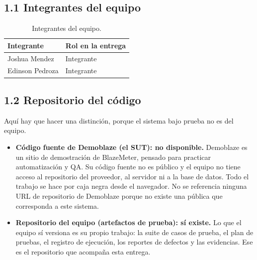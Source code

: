 \subsection*{1.1 Integrantes del equipo}

\begingroup
\small
\renewcommand{\arraystretch}{1.25}
\begin{table}[htb]\centering\small
\caption{Integrantes del equipo.}\label{tab:integrantes}
\begin{tabularx}{\textwidth}{@{}L{6cm} Y@{}}
\toprule
\textbf{Integrante} & \textbf{Rol en la entrega} \\
\midrule
Joshua Mendez & Integrante \\
Edinson Pedroza & Integrante \\
\bottomrule
\end{tabularx}
\end{table}
\endgroup

\subsection*{1.2 Repositorio del código}

Aquí hay que hacer una distinción, porque el sistema bajo prueba no es del equipo.

\begin{itemize}
  \item \textbf{Código fuente de Demoblaze (el SUT): no disponible.} Demoblaze es un
        sitio de demostración de BlazeMeter, pensado para practicar automatización y
        QA. Su código fuente no es público y el equipo no tiene acceso al repositorio
        del proveedor, al servidor ni a la base de datos. Todo el trabajo se hace por
        caja negra desde el navegador. No se referencia ninguna URL de repositorio de
        Demoblaze porque no existe una pública que corresponda a este sistema.
  \item \textbf{Repositorio del equipo (artefactos de prueba): sí existe.} Lo que el
        equipo sí versiona es su propio trabajo: la suite de casos de prueba, el plan
        de pruebas, el registro de ejecución, los reportes de defectos y las
        evidencias. Ese es el repositorio que acompaña esta entrega.
\end{itemize}

